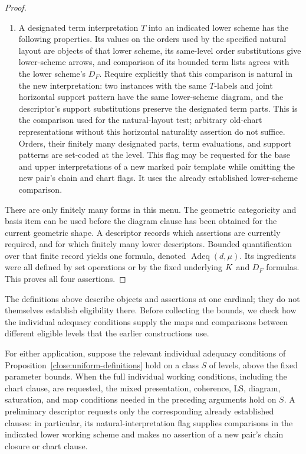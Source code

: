 \begin{proof}
\begin{enumerate}
a fixed base with prescribed complementary basis bijections holds.
The pieces and the bijections range over sets of subsets and functions
of the standardized carriers.
\item A designated term interpretation $T$ into an indicated lower
scheme has the following properties.  Its values on the orders used
by the specified natural layout are objects of that lower scheme,
its same-level order substitutions give lower-scheme arrows, and
comparison of its bounded term lists agrees with the lower scheme's
$D_F$.  Require explicitly that this comparison is natural in the
new interpretation: two instances with the same $T$-labels and joint
horizontal support pattern have the same lower-scheme diagram, and
the descriptor's support substitutions preserve the designated term
parts.  This is the comparison used for the natural-layout test;
arbitrary old-chart representations without this horizontal
naturality assertion do not suffice.  Orders, their finitely many
designated parts, term evaluations, and support patterns are set-coded
at the level.  This flag may be
requested for the base and upper interpretations of a new marked
pair template while omitting the new pair's chain and chart flags.
It uses the already established lower-scheme comparison.
\end{enumerate}
There are only finitely many forms in this menu.  The geometric
categoricity and basis item can be used before the diagram clause has
been obtained for the current geometric shape.
A descriptor records which assertions are currently required, and for
which finitely many lower descriptors.  Bounded quantification over that
finite record yields one formula, denoted
$\operatorname{Adeq}(d,\mu)$.  Its ingredients were all defined by set
operations or by the fixed underlying $K$ and $D_F$ formulas.  This
proves all four assertions.
\end{proof}

The definitions above describe objects and assertions at one cardinal;
they do not themselves establish eligibility there.  Before collecting
the bounds, we check how the individual adequacy conditions supply the
maps and comparisons between different eligible levels that the earlier
constructions use.

\begin{lemma}
\label{close:mixed-interface}
For either application, suppose the relevant individual adequacy
conditions of Proposition~\ref{close:uniform-definitions} hold on a class
$S$ of levels, above the fixed parameter bounds.  When the full individual
working conditions, including the chart clause, are requested, the mixed
presentation, coherence, LS, diagram, saturation, and map conditions
needed in the preceding arguments hold on $S$.  A preliminary descriptor
requests only the corresponding already established clauses: in
particular, its natural-interpretation flag supplies comparisons in the
indicated lower working scheme and makes no assertion of a new pair's
chain closure or chart clause.
\end{lemma}


